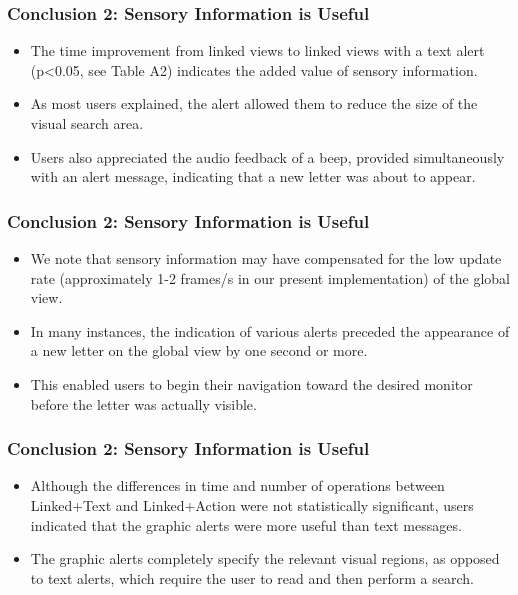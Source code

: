 \documentclass{beamer}
\begin{document}
\begin{frame}
\frametitle{Conclusion 2: Sensory Information is Useful}

\begin{itemize}
\item The time improvement from linked views to linked views with a text alert (p<0.05, see Table A2) indicates the added value of sensory information.
\item As most users explained, the alert allowed them to reduce the size of the visual search area.
\item Users also appreciated the audio feedback of a beep, provided simultaneously with an alert message, indicating that a new letter was about to appear.
\end{itemize}

\end{frame}

\begin{frame}
\frametitle{Conclusion 2: Sensory Information is Useful}

\begin{itemize}
\item We note that sensory information may have compensated for the low update rate (approximately 1-2 frames/s in our present implementation) of the global view.
\item In many instances, the indication of various alerts preceded the appearance of a new letter on the global view by one second or more.
\item This enabled users to begin their navigation toward the desired monitor before the letter was actually visible.
\end{itemize}

\end{frame}

\begin{frame}
\frametitle{Conclusion 2: Sensory Information is Useful}

\begin{itemize}
\item Although the differences in time and number of operations between Linked+Text and Linked+Action were not statistically significant, users indicated that the graphic alerts were more useful than text messages.
\item The graphic alerts completely specify the relevant visual regions, as opposed to text alerts, which require the user to read and then perform a search.
\end{itemize}

\end{frame}
\end{document}
